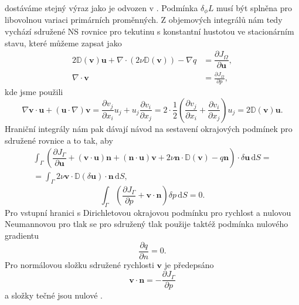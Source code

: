 dostáváme stejný výraz jako je odvozen v \cite{othmer2008continuous}.
Podmínka $ \delta_\phi L $ musí být splněna pro libovolnou variaci primárních proměnných. Z objemových integrálů nám tedy vychází sdružené NS rovnice pro tekutinu s konstantní hustotou ve stacionárním stavu, které můžeme zapsat jako
\begin{align}
2\mathbb{D}(\mathbf{v})\mathbf{u}
+ \nabla \cdot \left( 2\nu \mathbb{D}(\mathbf{v}) \right)
- \nabla q 
&=
\dfrac{\partial J_{\Omega}}{\partial \mathbf{u}} ,
\\
\nabla \cdot \mathbf{v} 
&= 
\frac{\partial J_\Omega}{\partial p},
\end{align}
kde jsme použili  
\begin{equation}
\nabla \mathbf{v}\cdot \mathbf{u}
+ (\mathbf{u} \cdot \nabla)\mathbf{v} 
=
\frac{\partial v_j}{\partial x_i}  u_j + u_j  \frac{\partial v_i}{\partial x_j} 
=
2\cdot\frac{1}{2}
\left(
\frac{\partial v_j}{\partial x_i}
+ \frac{\partial v_i}{\partial x_j} 
\right)
u_j
=
2\mathbb{D}(\mathbf{v})\mathbf{u}.
\end{equation}
Hraniční integrály nám pak dávají návod na sestavení okrajových podmínek pro sdružené rovnice a to tak, aby
\begin{multline}
\label{eq:sdruzenaOP1}
\int_{\Gamma}
\left(
\dfrac{\partial J_{\Gamma}}{\partial \mathbf{u}}
+ (\mathbf{v}\cdot \mathbf{u} )\mathbf{n} 
+ (\mathbf{n} \cdot \mathbf{u}) \mathbf{v}
+ 2\nu \mathbf{n} \cdot  \mathbb{D}(\mathbf{v})
- q \mathbf{n}
\right)
\cdot \delta \mathbf{u}
\, \mathrm{d}S
= \\=
\int_{\Gamma} 
2\nu \mathbf{v} \cdot  \mathbb{D}(\delta \mathbf{u})\cdot \mathbf{n}
\, \mathrm{d}S,
\end{multline}
\begin{equation}\label{eq:sdruzenaOP2}
\int_{\Gamma}
\left(
\frac{\partial J_\Gamma}{\partial p}
+ \mathbf{v} \cdot \mathbf{n}
\right)
\delta p
\, \mathrm{d}S
= 0.
\end{equation}
Pro vstupní hranici s Dirichletovou okrajovou podmínku pro rychlost a nulovou Neumannovou pro tlak se pro sdružený tlak použije taktéž podmínka nulového gradientu
\begin{equation}\label{key}
\frac{\partial q}{\partial n}=0.
\end{equation} 
Pro normálovou složku sdružené rychlosti $\mathbf{v}$ je předepsáno
\begin{equation}
\mathbf{v}\cdot \mathbf{n}=-\dfrac{\partial J_{\Gamma}}{\partial p}
\end{equation}
a složky tečné jsou nulové \cite{zymaris2009continuous}.

